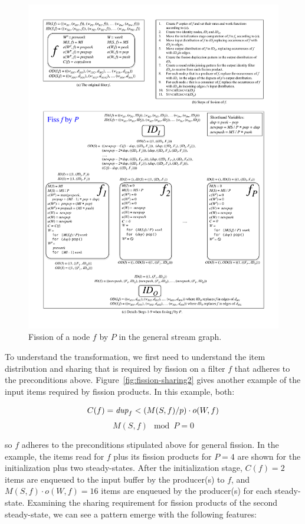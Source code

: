\begin{figure}
\centering
\includegraphics[width=\textwidth]{figures/general-fission.pdf}
\caption[Fission of a node in the general stream graph.]{Fission of a
  node $f$ by $P$ in the general stream
  graph.\label{fig:general-fission}}
\end{figure}

To understand the transformation, we first need to understand the item
distribution and sharing that is required by fission on a filter $f$
that adheres to the preconditions above.
Figure~\ref{fig:fission-sharing2} gives another example of the input
items required by fission products.  In this example, both:

\[ C(f) = \mbox{\it dup}_f < (M(S,f) / p) \cdot o(W, f) \]
\[ M(S, f) \mod P = 0\]

\noindent so $f$ adheres to the preconditions stipulated above for
general fission.  In the example, the items read for $f$ plus its
fission products for $P=4$ are shown for the initialization plus two
steady-states.  After the initialization stage, $C(f) = 2$ items are
enqueued to the input buffer by the producer(s) to $f$, and $M(S,f)
\cdot o(W, f) = 16$ items are enqueued by the producer(s) for each
steady-state.  Examining the sharing requirement for fission products of
the second steady-state, we can see a pattern emerge with the following
features:

